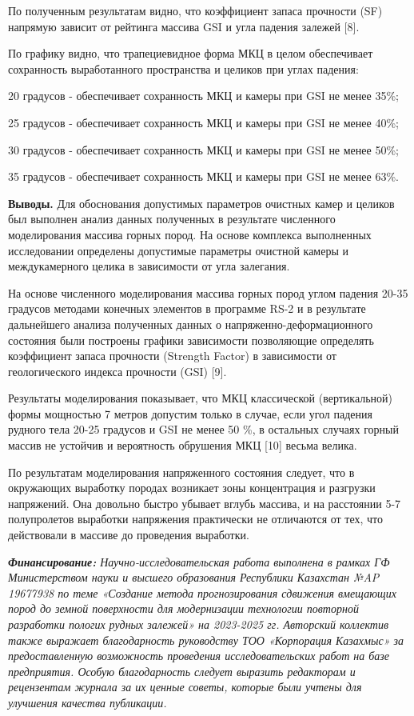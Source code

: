 \begin{multicols}{2}
По полученным результатам видно, что коэффициент запаса прочности (SF)
напрямую зависит от рейтинга массива GSI и угла падения залежей {[}8{]}.

По графику видно, что трапециевидное форма МКЦ в целом обеспечивает
сохранность выработанного пространства и целиков при углах падения:

20 градусов - обеспечивает сохранность МКЦ и камеры при GSI не менее
35\%;

25 градусов - обеспечивает сохранность МКЦ и камеры при GSI не менее
40\%;

30 градусов - обеспечивает сохранность МКЦ и камеры при GSI не менее
50\%;

35 градусов - обеспечивает сохранность МКЦ и камеры при GSI не менее
63\%.

{\bfseries Выводы.} Для обоснования допустимых параметров очистных камер и
целиков был выполнен анализ данных полученных в результате численного
моделирования массива горных пород. На основе комплекса выполненных
исследовании определены допустимые параметры очистной камеры и
междукамерного целика в зависимости от угла залегания.

На основе численного моделирования массива горных пород углом падения
20-35 градусов методами конечных элементов в программе RS-2 и в
результате дальнейшего анализа полученных данных о
напряженно-деформационного состояния были построены графики зависимости
позволяющие определять коэффициент запаса прочности (Strength Factor) в
зависимости от геологического индекса прочности (GSI) {[}9{]}.

Результаты моделирования показывает, что МКЦ классической (вертикальной)
формы мощностью 7 метров допустим только в случае, если угол падения
рудного тела 20-25 градусов и GSI не менее 50 \%, в остальных случаях
горный массив не устойчив и вероятность обрушения МКЦ {[}10{]} весьма
велика.

По результатам моделирования напряженного состояния следует, что в
окружающих выработку породах возникает зоны концентрация и разгрузки
напряжений. Она довольно быстро убывает вглубь массива, и на расстоянии
5-7 полупролетов выработки напряжения практически не отличаются от тех,
что действовали в массиве до проведения выработки.

\emph{{\bfseries Финансирование:} Научно-исследовательская работа выполнена
в рамках ГФ Министерством науки и высшего образования Республики
Казахстан №AP 19677938 по теме «Создание метода прогнозирования
сдвижения вмещающих пород до земной поверхности для модернизации
технологии повторной разработки пологих рудных залежей» на 2023-2025 гг.
Авторский коллектив также выражает благодарность руководству ТОО
«Корпорация Казахмыс» за предоставленную возможность проведения
исследовательских работ на базе предприятия. Особую благодарность
следует выразить редакторам и рецензентам журнала за их ценные советы,
которые были учтены для улучшения качества публикации.}
\end{multicols}

